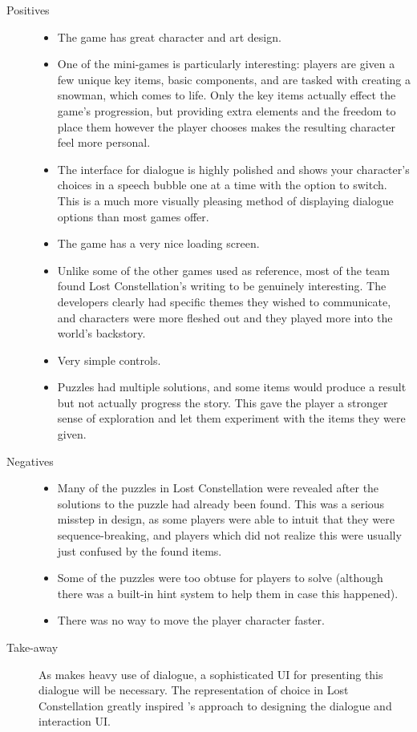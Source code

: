 \begin{description}
\item[Positives]{
\begin{itemize}
\item{The game has great character and art design.}
\item{One of the mini-games is particularly interesting: players are given a few unique key items, basic components, and are tasked with creating a snowman, which comes to life. Only the key items actually effect the game's progression, but providing extra elements and the freedom to place them however the player chooses makes the resulting character feel more personal.}
\item{The interface for dialogue is highly polished and shows your character's choices in a speech bubble one at a time with the option to switch. This is a much more visually pleasing method of displaying dialogue options than most games offer.}
\item{The game has a very nice loading screen.}
\item{Unlike some of the other games used as reference, most of the team found Lost Constellation's writing to be genuinely interesting. The developers clearly had specific themes they wished to communicate, and characters were more fleshed out and they played more into the world's backstory.}
\item{Very simple controls.}
\item{Puzzles had multiple solutions, and some items would produce a result but not actually progress the story. This gave the player a stronger sense of exploration and let them experiment with the items they were given.}
\end{itemize}
}
\item[Negatives]{
\begin{itemize}
\item{Many of the puzzles in Lost Constellation were revealed after the solutions to the puzzle had already been found. This was a serious misstep in design, as some players were able to intuit that they were sequence-breaking, and players which did not realize this were usually just confused by the found items.}
\item{Some of the puzzles were too obtuse for players to solve (although there was a built-in hint system to help them in case this happened).}
\item{There was no way to move the player character faster.}
\end{itemize}
}
\item[Take-away]{As \ourgame{} makes heavy use of dialogue, a sophisticated UI for presenting this dialogue will be necessary. The representation of choice in Lost Constellation greatly inspired \ourteam{}'s approach to designing the dialogue and interaction UI.}
\end{description}



